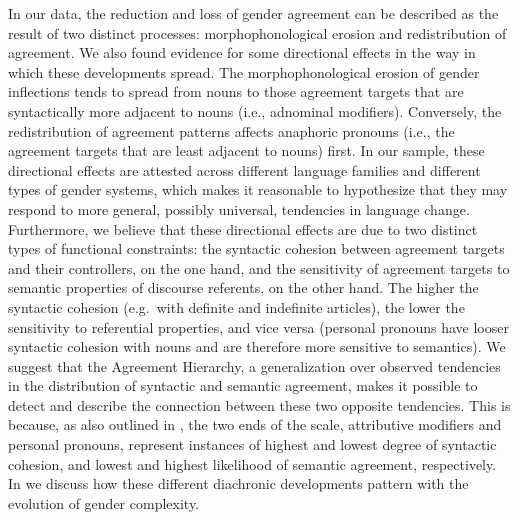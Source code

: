 \documentclass[output=collectionpaper]{langsci/langscibook}
\begin{document}
In our data, the reduction and loss of gender agreement can be described as the result of two distinct processes: morphophonological erosion and redistribution of agreement. We also found evidence for some directional effects in the way in which these developments spread. The morphophonological erosion of gender inflections tends to spread from nouns to those agreement targets that are syntactically more adjacent to nouns (i.e., adnominal modifiers). Conversely, the redistribution of agreement patterns affects anaphoric pronouns (i.e., the agreement targets that are least adjacent to nouns) first.  In our sample, these directional effects are attested across different language families and different types of gender systems, which makes it reasonable to hypothesize that they may respond to more general, possibly universal, tendencies in language change. Furthermore, we believe that these directional effects are due to two distinct types of functional constraints: the syntactic cohesion between agreement targets and their controllers, on the one hand, and the sensitivity of agreement targets to semantic properties of discourse referents, on the other hand.  The higher the syntactic cohesion (e.g.\ with definite and indefinite articles), the lower the sensitivity to referential properties, and vice versa (personal pronouns have looser syntactic cohesion with nouns and are therefore more sensitive to semantics). We suggest that the Agreement Hierarchy, a generalization over observed tendencies in the distribution of syntactic and semantic agreement, makes it possible to detect and describe the connection between these two opposite tendencies. This is because, as also outlined in , the two ends of the scale, attributive modifiers and personal pronouns, represent instances of highest and lowest degree of syntactic cohesion, and lowest and highest likelihood of semantic agreement, respectively. In  we discuss how these different diachronic developments pattern with the evolution of gender complexity.
\end{document}
